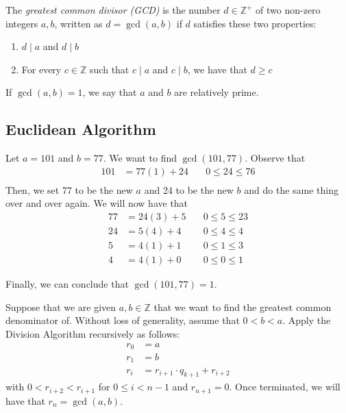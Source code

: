 \begin{definition}
    The \textit{greatest common divisor (GCD)} is the number \(d \in \mathbb{Z}^+\) of two non-zero integers \(a, b\), written as \(d = \gcd(a, b)\) if \(d\) satisfies these two properties:
    \begin{enumerate}
        \item \(d \mid a\) and \(d \mid b\)
        \item For every \(c \in \mathbb{Z}\) such that \(c \mid a\) and \(c \mid b\), we have that \(d \geq c\)
    \end{enumerate}
\end{definition}

\begin{definition}
    If \(\gcd(a, b) = 1\), we say that \(a\) and \(b\) are relatively prime.
\end{definition}

\subsection{Euclidean Algorithm}

\begin{nexample}
    Let \(a = 101\) and \(b = 77\). We want to find \(\gcd(101, 77)\). Observe that 
    \[
    \begin{aligned}
        101 &= 77(1) + 24 &\quad 0 \leq 24 \leq 76 \\
    \end{aligned}
    \]
    Then, we set 77 to be the new \(a\) and 24 to be the new \(b\) and do the same thing over and over again. We will now have that
    \[
    \begin{aligned}
        77 &= 24(3) + 5 &\quad 0 \leq 5 \leq 23 \\
        24 &= 5(4) + 4 &\quad 0 \leq 4 \leq 4 \\
        5 &= 4(1) + 1 &\quad 0 \leq 1 \leq 3 \\
        4 &= 4(1) + 0 &\quad 0 \leq 0 \leq 1
    \end{aligned}
    \]

    Finally, we can conclude that \(\gcd(101, 77) = 1\).
\end{nexample}

\begin{theorem}
    Suppose that we are given \(a, b \in \mathbb{Z}\) that we want to find the greatest common denominator of. Without loss of generality, assume that \(0 < b < a\). Apply the Division Algorithm recursively as follows:
    \[
    \begin{aligned}
        r_0 &= a \\
        r_1 &= b \\
        r_{i} &= r_{i+1} \cdot q_{k+1} + r_{i+2}
    \end{aligned}
    \]
    with \(0 < r_{i+2} < r_{i+1}\) for \(0 \leq i < n - 1\) and \(r_{n+1} = 0\). Once terminated, we will have that \(r_n = \gcd(a, b)\).
\end{theorem}

